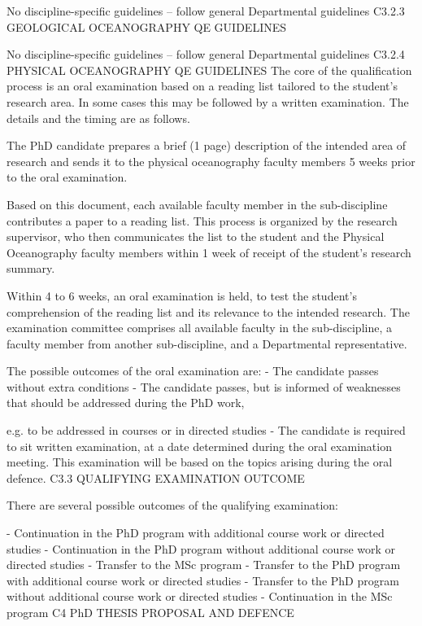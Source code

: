 \documentclass{article}
\begin{document}
No discipline-specific guidelines – follow general Departmental guidelines
C3.2.3  GEOLOGICAL OCEANOGRAPHY QE GUIDELINES

No discipline-specific guidelines – follow general Departmental guidelines
C3.2.4  PHYSICAL OCEANOGRAPHY QE GUIDELINES
The core of the qualification process is an oral examination based on a reading list tailored to the student’s research area. In some cases this may be followed by a written examination. The details and the timing are as follows.

The PhD candidate prepares a brief (1 page) description of the intended area of research and sends it to the physical oceanography faculty members 5 weeks prior to the oral examination.

Based on this document, each available faculty member in the sub-discipline contributes a paper to a reading list. This process is organized by the research supervisor, who then communicates the list to the student and the Physical Oceanography faculty members within 1 week of receipt of the student’s research summary.

Within 4 to 6 weeks, an oral examination is held, to test the student’s comprehension of the reading list and its relevance to the intended research. The examination committee comprises all available faculty in the sub-discipline, a faculty member from another sub-discipline, and a Departmental representative.

The possible outcomes of the oral examination are:
-	The candidate passes without extra conditions
-	The candidate passes, but is informed of weaknesses that should be addressed during the PhD work,
 

e.g. to be addressed in courses or in directed studies
-	The candidate is required to sit written examination, at a date determined during the oral examination meeting. This examination will be based on the topics arising during the oral defence.
C3.3	QUALIFYING EXAMINATION OUTCOME

There are several possible outcomes of the qualifying examination:

-	Continuation in the PhD program with additional course work or directed studies
-	Continuation in the PhD program without additional course work or directed studies
-	Transfer to the MSc program
-	Transfer to the PhD program with additional course work or directed studies
-	Transfer to the PhD program without additional course work or directed studies
-	Continuation in the MSc program
C4	PhD THESIS PROPOSAL AND DEFENCE
\end{document}
